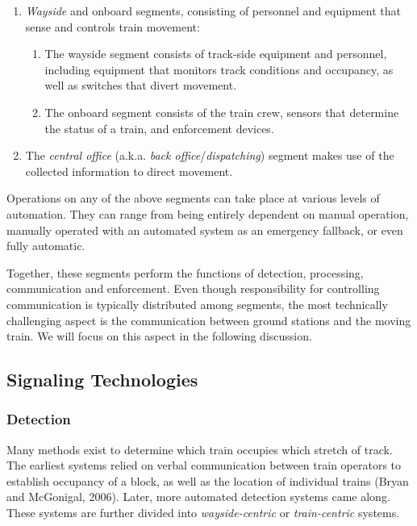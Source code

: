 \documentclass[11pt, titlepage]{article}
\begin{document}
\begin{enumerate}
    \item \textit{Wayside} and {onboard} segments, consisting of personnel and
    equipment that sense and controls train movement:
    \begin{enumerate}
        \item The wayside segment consists of track-side equipment and personnel,
        including equipment that monitors track conditions and occupancy, as well
        as switches that divert movement.
        \item The onboard segment consists of the train crew, sensors that
        determine the status of a train, and enforcement devices.
    \end{enumerate}
    \item The \textit{central office} (a.k.a. \textit{back
    office}/\textit{dispatching}) segment makes use of the collected information
    to direct movement.
\end{enumerate}
Operations on any of the above segments can take place at various levels of
automation. They can range from being entirely dependent on manual operation,
manually operated with an automated system as an emergency fallback, or even fully
automatic.

Together, these segments perform the functions of detection, processing,
communication and enforcement. Even though responsibility for controlling
communication is typically distributed among segments, the most technically
challenging aspect is the communication between ground stations and the moving
train. We will focus on this aspect in the following discussion.

\subsection{Signaling Technologies}

\subsubsection{Detection}

Many methods exist to determine which train occupies which stretch of track. The
earliest systems relied on verbal communication between train operators to
establish occupancy of a block, as well as the location of individual trains
(Bryan and McGonigal, 2006). Later, more automated detection systems came along.
These systems are further divided into \textit{wayside-centric} or
\textit{train-centric} systems.
\end{document}

